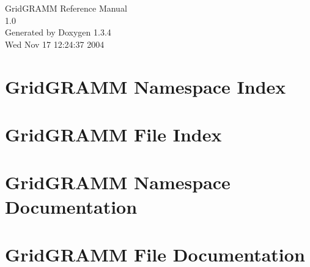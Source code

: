 \documentclass[a4paper]{book}
\begin{document}
\begin{titlepage}
\vspace*{7cm}
\begin{center}
{\Large Grid\-GRAMM Reference Manual\\[1ex]\large 1.0 }\\
\vspace*{1cm}
{\large Generated by Doxygen 1.3.4}\\
\vspace*{0.5cm}
{\small Wed Nov 17 12:24:37 2004}\\
\end{center}
\end{titlepage}
\clearemptydoublepage
{}
\tableofcontents
\clearemptydoublepage
{}
\chapter{Grid\-GRAMM Namespace Index}

\chapter{Grid\-GRAMM File Index}

\chapter{Grid\-GRAMM Namespace Documentation}

\chapter{Grid\-GRAMM File Documentation}






\printindex
\end{document}
